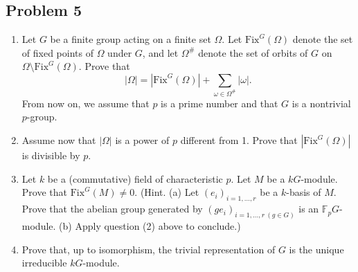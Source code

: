 \subsection*{Problem 5}
\begin{enumerate}
    \item[(i)] Let $G$ be a finite group acting on a finite set $\Omega$. Let $\mathrm{Fix}^G(\Omega)$ denote the set of fixed points of $\Omega$ under $G$, and let $\Omega^\#$ denote the set of orbits of $G$ on $\Omega \setminus \mathrm{Fix}^G(\Omega)$. Prove that
    $$
    |\Omega| = |\mathrm{Fix}^G(\Omega)| + \sum_{\omega \in \Omega^\#} |\omega|.
    $$
    From now on, we assume that $p$ is a prime number and that $G$ is a nontrivial $p$-group.
    \item[(ii)] Assume now that $|\Omega|$ is a power of $p$ different from 1. Prove that $|\mathrm{Fix}^G(\Omega)|$ is divisible by $p$.
    \item[(iii)] Let $k$ be a (commutative) field of characteristic $p$. Let $M$ be a $kG$-module. Prove that $\mathrm{Fix}^G(M) \neq 0$. (Hint. (a) Let $(e_i)_{i=1,\dots,r}$ be a $k$-basis of $M$. Prove that the abelian group generated by $(g e_i)_{i=1,\dots,r \ (g \in G)}$ is an $\mathbb{F}_p G$-module. (b) Apply question (2) above to conclude.)
    \item[(iv)] Prove that, up to isomorphism, the trivial representation of $G$ is the unique irreducible $kG$-module.
\end{enumerate}
